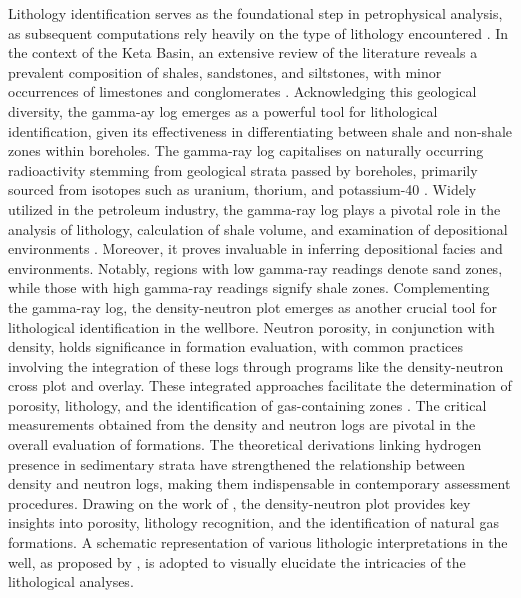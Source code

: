 \documentclass{gji}
\begin{document}
Lithology identification serves as the foundational step in petrophysical analysis, as subsequent computations rely heavily on the type of lithology encountered \citep{akinyokun2009well}. 
In the context of the Keta Basin, an extensive review of the literature reveals a prevalent composition of shales, sandstones, and siltstones, with minor occurrences of limestones and conglomerates \citep{brownfield2006geology}.
Acknowledging this geological diversity, the gamma-ay log emerges as a powerful tool for lithological identification, given its effectiveness in differentiating between shale and non-shale zones within boreholes.
The gamma-ray log capitalises on naturally occurring radioactivity stemming from geological strata passed by boreholes, primarily sourced from isotopes such as uranium, thorium, and potassium-40  \citep{asfahani2021radioactivity}.
Widely utilized in the petroleum industry, the gamma-ray log plays a pivotal role in the analysis of lithology, calculation of shale volume, and examination of depositional environments \citep{mondol2015well}.
Moreover, it proves invaluable in inferring depositional facies and environments.
Notably, regions with low gamma-ray readings denote sand zones, while those with high gamma-ray readings signify shale zones.
Complementing the gamma-ray log, the density-neutron plot emerges as another crucial tool for lithological identification in the wellbore. 
Neutron porosity, in conjunction with density, holds significance in formation evaluation, with common practices involving the integration of these logs through programs like the density-neutron cross plot and overlay. 
These integrated approaches facilitate the determination of porosity, lithology, and the identification of gas-containing zones \citep{rodriguez2009new}.
The critical measurements obtained from the density and neutron logs are pivotal in the overall evaluation of formations.
The theoretical derivations linking hydrogen presence in sedimentary strata have strengthened the relationship between density and neutron logs, making them indispensable in contemporary assessment procedures.
Drawing on the work of \citep{mao2001physical}, the density-neutron plot provides key insights into porosity, lithology recognition, and the identification of natural gas formations.
A schematic representation of various lithologic interpretations in the well, as proposed by \cite{mondol2015well}, is adopted to visually elucidate the intricacies of the lithological analyses.
\end{document}
